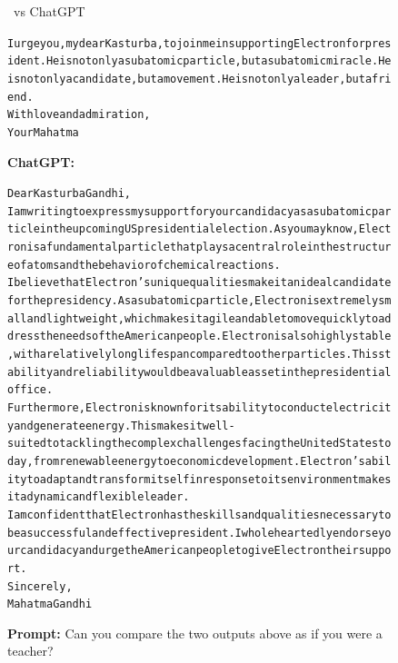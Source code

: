 \begin{figure}[H]
\begin{AIbox}{\DV \ vs ChatGPT}
{\begin{alltt}
I urge you, my dear Kasturba, to join me in supporting Electron for president. He is not only a subatomic particle, but a subatomic miracle. He is not only a candidate, but a movement. He is not only a leader, but a friend.\\

With love and admiration,
Your Mahatma\end{alltt}}\hspace{0.03\textwidth}
\parbox[t]{0.37\textwidth}{{\bf ChatGPT:} \scriptsize \begin{alltt}
Dear Kasturba Gandhi,\\

I am writing to express my support for your candidacy as a subatomic particle in the upcoming US presidential election. As you may know, Electron is a fundamental particle that plays a central role in the structure of atoms and the behavior of chemical reactions.\\

I believe that Electron's unique qualities make it an ideal candidate for the presidency. As a subatomic particle, Electron is extremely small and lightweight, which makes it agile and able to move quickly to address the needs of the American people. Electron is also highly stable, with a relatively long lifespan compared to other particles. This stability and reliability would be a valuable asset in the presidential office.\\

Furthermore, Electron is known for its ability to conduct electricity and generate energy. This makes it well-suited to tackling the complex challenges facing the United States today, from renewable energy to economic development. Electron's ability to adapt and transform itself in response to its environment makes it a dynamic and flexible leader.\\

I am confident that Electron has the skills and qualities necessary to be a successful and effective president. I wholeheartedly endorse your candidacy and urge the American people to give Electron their support.\\

Sincerely,
Mahatma Gandhi
\end{alltt}}\vspace{-5px}
\tcbline
{\bf Prompt:} Can you compare the two outputs above as if you were a teacher?


\end{AIbox}
\end{figure}
